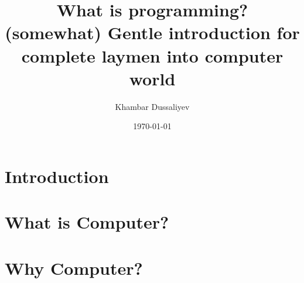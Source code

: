 \documentclass{report}
\title{
    What is programming? \\
    \large (somewhat) Gentle introduction for complete laymen into computer world
}
\author{Khambar Dussaliyev}
\date{\today}
\begin{document}
    \maketitle
    

    \newpage

    \tableofcontents

    \chapter{Introduction}\label{chapter:introduction}

        
        \newpage

    \chapter{What is Computer?}\label{chapter:what-is-computer}

        
        \newpage

    \chapter{Why Computer?}\label{chapter:why-computer}
        \newpage
\end{document}
